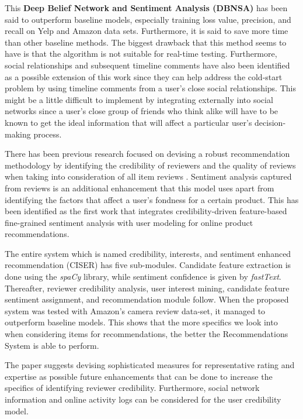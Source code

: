 \documentclass[manuscript,screen,natbib=false]{acmart}
\begin{document}
This \textbf{Deep Belief Network and Sentiment Analysis (DBNSA)} has been said to outperform baseline models, especially training loss value, precision, and recall on Yelp and Amazon data sets. Furthermore, it is said to save more time than other baseline methods. The biggest drawback that this method seems to have is that the algorithm is not suitable for real-time testing.
Furthermore, social relationships and subsequent timeline comments have also been identified as a possible extension of this work since they can help address the cold-start problem by using timeline comments from a user's close social relationships. This might be a little difficult to implement by integrating externally into social networks since a user's close group of friends who think alike will have to be known to get the ideal information that will affect a particular user's decision-making process.

\bigbreak

There has been previous research focused on devising a robust recommendation methodology by identifying the credibility of reviewers and the quality of reviews when taking into consideration of all item reviews \cite{hu_reviewer_2020}. Sentiment analysis captured from reviews is an additional enhancement that this model uses apart from identifying the factors that affect a user's fondness for a certain product. This has been identified as the first work that integrates credibility-driven feature-based fine-grained sentiment analysis with user modeling for online product recommendations.

The entire system which is named credibility, interests, and sentiment enhanced recommendation (CISER) has five sub-modules. Candidate feature extraction is done using the \emph{spaCy} library, while sentiment confidence is given by \emph{fastText}. Thereafter, reviewer credibility analysis, user interest mining, candidate feature sentiment assignment, and recommendation module follow.
When the proposed system was tested with Amazon's camera review data-set, it managed to outperform baseline models. This shows that the more specifics we look into when considering items for recommendations, the better the Recommendations System is able to perform. 

The paper suggests devising sophisticated measures for representative rating and expertise as possible future enhancements that can be done to increase the specifics of identifying reviewer credibility. Furthermore, social network information and online activity logs can be considered for the user credibility model.
\end{document}
